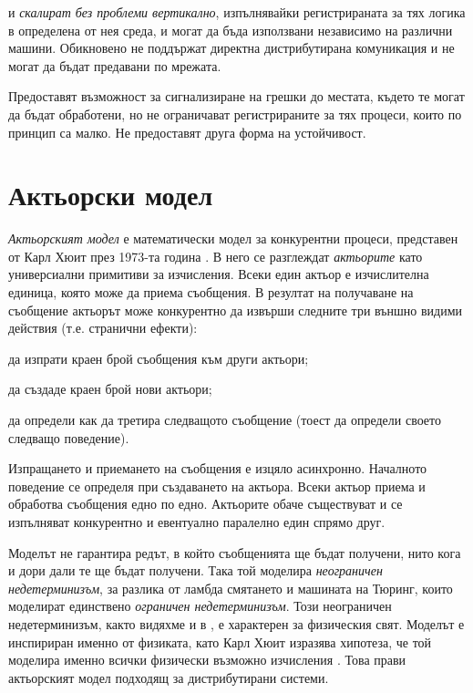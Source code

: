  и  \emph{скалират без проблеми вертикално}, изпълнявайки регистрираната за тях логика в определена от нея среда, и могат да бъда използвани независимо на различни машини. Обикновено не поддържат директна дистрибутирана комуникация и не могат да бъдат предавани по мрежата.

Предоставят възможност за сигнализиране на грешки до местата, където те могат да бъдат обработени, но не ограничават регистрираните за тях процеси, които по принцип са малко. Не предоставят друга форма на устойчивост.

\section{Актьорски модел}
\label{sec:actor-model}

\emph{Актьорският модел} е математически модел за конкурентни процеси, представен от Карл Хюит през 1973-та година \cite{hewitt1973ActorAIO}. В него се разглеждат \emph{актьорите} като универсиални примитиви за изчисления. Всеки един актьор е изчислителна единица, която може да приема съобщения. В резултат на получаване на съобщение актьорът може конкурентно да извърши следните три външно видими действия (т.е. странични ефекти):

\begin{itemize*}
  \item да изпрати краен брой съобщения към други актьори;
  \item да създаде краен брой нови актьори;
  \item да определи как да третира следващото съобщение (тоест да определи своето следващо поведение).
\end{itemize*}

Изпращането и приемането на съобщения е изцяло асинхронно. Началното поведение се определя при създаването на актьора. Всеки актьор приема и обработва съобщения едно по едно. Актьорите обаче съществуват и се изпълняват конкурентно и евентуално паралелно един спрямо друг.

Моделът не гарантира редът, в който съобщенията ще бъдат получени, нито кога и дори дали те ще бъдат получени. Така той моделира \emph{неограничен недетерминизъм}, за разлика от ламбда смятането и машината на Тюринг, които моделират единствено \emph{ограничен недетерминизъм}. Този неограничен недетерминизъм, както видяхме и в , е характерен за физическия свят. Моделът е инспириран именно от физиката, като Карл Хюит изразява хипотеза, че той моделира именно всички физически възможно изчисления \cite{hewitt2010ActorModel}. Това прави актьорският модел подходящ за дистрибутирани системи.

